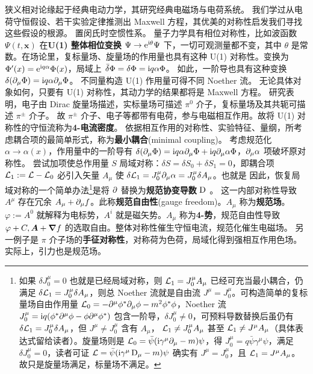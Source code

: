 狭义相对论缘起于经典电动力学，其研究经典电磁场与电荷系统。
我们学过从电荷守恒假设、若干实验定律推测出 Maxwell 方程，其优美的对称性启发我们寻找这些假设的根源。
置闵氏时空惯性系。
量子力学具有相位对称性，比如波函数 $\Psi(t,\bm x)$ 在\textbf{U(1) 整体相位变换} $\Psi\to \mathrm{e}^{\mathrm{i}\theta}\Psi$ 下，一切可观测量都不变，其中 $\theta$ 是常数。在场论里，复标量场、旋量场的作用量也具有这种 U(1) 对称性。变换为 $\Phi'(x) = \mathrm{e}^{\mathrm{i} q \alpha} \Phi(x)$，局域上 $\bar\delta\Phi = \delta\Phi = \mathrm{i} q \alpha \Phi$。
如此，一阶导也具有这种变换 $\delta(\partial_\mu\Phi)=\mathrm{i} q \alpha \partial_\mu\Phi$。
不同量构造 U(1) 作用量可得不同 Noether 流。
无论具体对象如何，只要有 U(1) 对称性，其动力学的结果都将是 Maxwell 方程。
研究表明，电子由 Dirac 旋量场描述，实标量场可描述 $\pi^0$ 介子，复标量场及其共轭可描述 $\pi^\pm$ 介子。
故 $\pi^\pm$ 介子、电子等都带有电荷，参与电磁相互作用。故将 U(1) 对称性的守恒流称为\textbf{4-电流密度}。
依据相互作用的对称性、实验特征、量纲，所考虑耦合项的最简单形式，称为\textbf{最小耦合}(minimal coupling)。
考虑规范化 $\alpha\to \alpha(x)$，作用量中的一阶导有 $\delta(\partial_\mu\Phi)=\mathrm{i} q \alpha \partial_\mu\Phi + \mathrm{i} q \partial_\mu\alpha \Phi$，$\partial_\mu\alpha$ 项破坏原对称性。
尝试加项使总作用量 $S$ 局域对称：$\delta S = \delta S_0 + \delta S_1 = 0$，即耦合项 $\mathcal{L}_1:=\mathcal{L}-\mathcal{L}_0$ 必引入矢量 $A_\mu$ 使 $\delta\mathcal{L}_1 = J^\mu_0 \partial_\mu\alpha = J^\mu_0\delta A_\mu$。也就是
因此，恢复局域对称的一个简单办法\footnote{如果 $\delta J_0^\mu = 0$ 也就是已经局域对称，则 $\mathcal{L}_1 = J_0^\mu A_\mu$ 已经可充当最小耦合，仍满足 $\delta\mathcal{L}_1 =J_0^\mu\delta A_\mu$，则总 Noether 流就是自由流 $J^\mu = J^\mu_0$。可构造简单的复标量场自由作用量 $\mathcal{L}_0=-\partial^\mu\phi^*\partial_\mu\phi-m^2\phi^*\phi$，Noether 流 $J_0^\mu = \mathrm{i} q(\phi^* \partial^\mu \phi - \phi\partial^\mu \phi^*)$ 包含一阶导，$\delta J_0^\mu \ne 0$，可预料导数替换后虽仍有 $\delta\mathcal{L}_1 = J^\mu_0\delta A_\mu$，但 $J^\mu\ne J^\mu_0$ 含有 $A_\mu$， $\mathcal{L}_1\ne J_0^\mu A_\mu$ 甚至 $\mathcal{L}_1\ne J^\mu A_\mu$（具体表达式留给读者）。旋量场则是 $\mathcal{L}_0=\bar\psi(\mathrm{i}\gamma^\mu\partial_\mu - m)\psi$，得 $J_0^\mu = q\bar\psi\gamma^\mu\psi$，满足$\delta J_0^\mu = 0$，读者可证 $\Lag=\bar\psi(\i\gamma^\mu \D_\mu - m)\psi$ 确实有 $J^\mu=J_0^\mu$，且 $\mathcal{L}_1=J^\mu A_\mu$。故只是旋量场满足，标量场不满足。}是将 $\partial$ 替换为\textbf{规范协变导数} $\D$。
这一内部对称性导致 $A^\mu$ 存在冗余 $A_\mu+\partial_\mu f$。此称\textbf{规范自由性}(gauge freedom)。$A_\mu$ 称为\textbf{规范场}。
$\varphi:=A^0$ 就解释为电标势，$A^i$ 就是磁矢势。$A_\mu$ 称为\textbf{4-势}，规范自由性导致 $\varphi+C,\bm A+\grad f$ 的选取自由。整体对称性催生守恒电流，规范化催生电磁场。
另一例子是 $\pi$ 介子场的\textbf{手征对称性}，对称荷为色荷，局域化得到强相互作用色场。实际上，引力也是规范场。


